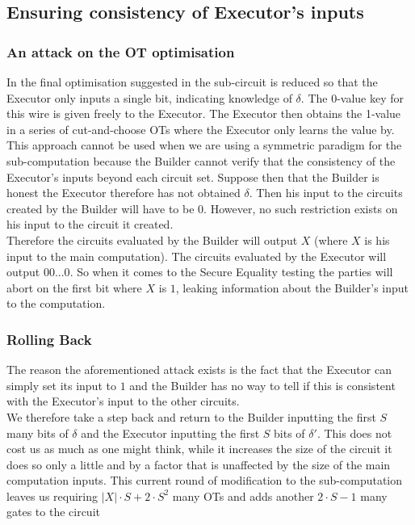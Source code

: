 \documentclass[ %
                    author={Nicholas Tutte},
                supervisor={Prof. Nigel Smart},
                    degree={MEng},
                     title={Secure Two Party Computation},
                  subtitle={A practical comparison of recent protocols},
                      type={Research - GG1K},
                      year={2015} ]{dissertation}
\begin{document}
			\subsection{Ensuring consistency of Executor's inputs}
				\subsubsection{An attack on the OT optimisation}
					In the final optimisation suggested in \cite{Lindell_CnC_2013} the sub-circuit is reduced so that the Executor only inputs a single bit, indicating knowledge of $\delta$. The 0-value key for this wire is given freely to the Executor. The Executor then obtains the 1-value in a series of cut-and-choose OTs where the Executor only learns the value by.\\

					This approach cannot be used when we are using a symmetric paradigm for the sub-computation because the Builder cannot verify that the consistency of the Executor's inputs beyond each circuit set. Suppose then that the Builder is honest the Executor therefore has not obtained $\delta$. Then his input to the circuits created by the Builder will have to be $0$. However, no such restriction exists on his input to the circuit it created.\\

					Therefore the circuits evaluated by the Builder will output $X$ (where $X$ is his input to the main computation). The circuits evaluated by the Executor will output $00...0$. So when it comes to the Secure Equality testing the parties will abort on the first bit where $X$ is $1$, leaking information about the Builder's input to the computation.

				\subsubsection{Rolling Back}
					The reason the aforementioned attack exists is the fact that the Executor can simply set its input to $1$ and the Builder has no way to tell if this is consistent with the Executor's input to the other circuits.\\

					We therefore take a step back and return to the Builder inputting the first $S$ many bits of $\delta$ and the Executor inputting the first $S$ bits of $\delta'$. This does not cost us as much as one might think, while it increases the size of the circuit it does so only a little and by a factor that is unaffected by the size of the main computation inputs. This current round of modification to the sub-computation leaves us requiring $|X| \cdot S + 2 \cdot S^2$ many OTs and adds another $2 \cdot S - 1$ many gates to the circuit
\end{document}
